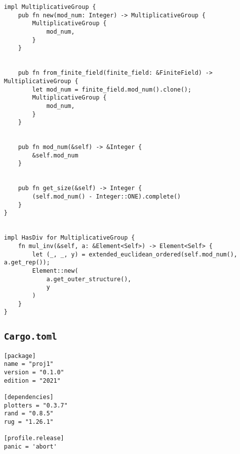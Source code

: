 \begin{verbatim}
impl MultiplicativeGroup {
    pub fn new(mod_num: Integer) -> MultiplicativeGroup {
        MultiplicativeGroup {
            mod_num,
        }
    }


    pub fn from_finite_field(finite_field: &FiniteField) -> MultiplicativeGroup {
        let mod_num = finite_field.mod_num().clone();
        MultiplicativeGroup {
            mod_num,
        }
    }


    pub fn mod_num(&self) -> &Integer {
        &self.mod_num
    }


    pub fn get_size(&self) -> Integer {
        (self.mod_num() - Integer::ONE).complete()
    }
}


impl HasDiv for MultiplicativeGroup {
    fn mul_inv(&self, a: &Element<Self>) -> Element<Self> {
        let (_, _, y) = extended_euclidean_ordered(self.mod_num(), a.get_rep());
        Element::new(
            a.get_outer_structure(),
            y
        )
    }
}
\end{verbatim}


\subsection{\texttt{Cargo.toml}}
\begin{verbatim}
[package]
name = "proj1"
version = "0.1.0"
edition = "2021"

[dependencies]
plotters = "0.3.7"
rand = "0.8.5"
rug = "1.26.1"

[profile.release]
panic = 'abort'
\end{verbatim}


